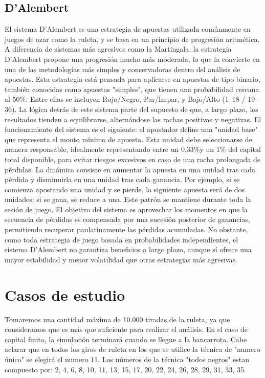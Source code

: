 \documentclass{article}
\begin{document}
\subsection{D'Alembert}
El sistema D’Alembert es una estrategia de apuestas utilizada comúnmente en juegos de azar como la ruleta, y se basa en un principio de progresión aritmética. A diferencia de sistemas más agresivos como la Martingala, la estrategia D’Alembert propone una progresión mucho más moderada, lo que la convierte en una de las metodologías más simples y conservadoras dentro del análisis de apuestas.
Esta estrategia está pensada para aplicarse en apuestas de tipo binario, también conocidas como apuestas "simples", que tienen una probabilidad cercana al 50\%. Entre ellas se incluyen Rojo/Negro, Par/Impar, y Bajo/Alto (1–18 / 19–36). La lógica detrás de este sistema parte del supuesto de que, a largo plazo, los resultados tienden a equilibrarse, alternándose las rachas positivas y negativas.
El funcionamiento del sistema es el siguiente: el apostador define una "unidad base" que representa el monto mínimo de apuesta. Esta unidad debe seleccionarse de manera responsable, idealmente representando entre un 0,33\%y un 1\% del capital total disponible, para evitar riesgos excesivos en caso de una racha prolongada de pérdidas.
La dinámica consiste en aumentar la apuesta en una unidad tras cada pérdida y disminuirla en una unidad tras cada ganancia. Por ejemplo, si se comienza apostando una unidad y se pierde, la siguiente apuesta será de dos unidades; si se gana, se reduce a una. Este patrón se mantiene durante toda la sesión de juego.
El objetivo del sistema es aprovechar los momentos en que la secuencia de pérdidas es compensada por una sucesión posterior de ganancias, permitiendo recuperar paulatinamente las pérdidas acumuladas. No obstante, como toda estrategia de juego basada en probabilidades independientes, el sistema D’Alembert no garantiza beneficios a largo plazo, aunque sí ofrece una mayor estabilidad y menor volatilidad que otras estrategias más agresivas.




\section{Casos de estudio}
Tomaremos una cantidad máxima de 10.000 tiradas de la ruleta, ya que consideramos que es más que suficiente para realizar el análisis. En el caso de capital finito, la simulación terminará cuando se llegue a la bancarrota.
Cabe aclarar que en todos los giros de ruleta en los que se utilice la técnica de "numero único" se elegirá el numero 11. Los números de la técnica "todos negros" estan compuesto por: 2, 4, 6, 8, 10, 11, 13, 15, 17, 20, 22, 24, 26, 28, 29, 31, 33, 35.
\end{document}
